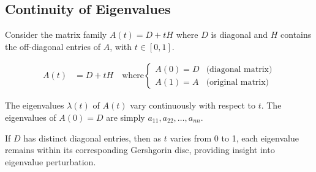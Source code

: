 \subsection{Continuity of Eigenvalues}

Consider the matrix family $A(t) = D + tH$ where $D$ is diagonal and $H$ contains the off-diagonal entries of $A$, with $t \in [0,1]$.

\begin{align}
    A(t) &= D + tH \quad \text{where} \begin{cases}
        A(0) = D & \text{(diagonal matrix)} \\
        A(1) = A & \text{(original matrix)}
    \end{cases}
\end{align}

The eigenvalues $\lambda(t)$ of $A(t)$ vary continuously with respect to $t$. The eigenvalues of $A(0) = D$ are simply $a_{11}, a_{22}, \ldots, a_{nn}$.

If $D$ has distinct diagonal entries, then as $t$ varies from 0 to 1, each eigenvalue remains within its corresponding Gershgorin disc, providing insight into eigenvalue perturbation.